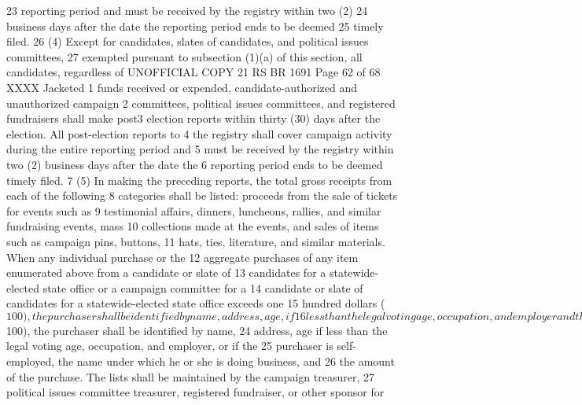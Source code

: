 23 reporting period and must be received by the registry within two (2)
24 business days after the date the reporting period ends to be deemed
25 timely filed.
26 (4) Except for candidates, slates of candidates, and political issues committees,
27 exempted pursuant to subsection (1)(a) of this section, all candidates, regardless of 
UNOFFICIAL COPY 21 RS BR 1691
Page 62 of 68
XXXX Jacketed
1 funds received or expended, candidate-authorized and unauthorized campaign
2 committees, political issues committees, and registered fundraisers shall make post3 election reports within thirty (30) days after the election. All post-election reports to
4 the registry shall cover campaign activity during the entire reporting period and
5 must be received by the registry within two (2) business days after the date the
6 reporting period ends to be deemed timely filed.
7 (5) In making the preceding reports, the total gross receipts from each of the following
8 categories shall be listed: proceeds from the sale of tickets for events such as
9 testimonial affairs, dinners, luncheons, rallies, and similar fundraising events, mass
10 collections made at the events, and sales of items such as campaign pins, buttons,
11 hats, ties, literature, and similar materials. When any individual purchase or the
12 aggregate purchases of any item enumerated above from a candidate or slate of
13 candidates for a statewide-elected state office or a campaign committee for a
14 candidate or slate of candidates for a statewide-elected state office exceeds one
15 hundred dollars ($100), the purchaser shall be identified by name, address, age, if
16 less than the legal voting age, occupation, and employer and the employer of the
17 spouse of the purchaser or, if the purchaser or the spouse of the purchaser is self18 employed, the name under which he or she is doing business, and the amount of the
19 purchase. When any individual purchase or the aggregate purchases of any item
20 enumerated above from any candidate or campaign committee other than a
21 candidate or slate of candidates for a statewide-elected state office or campaign
22 committee for a candidate or slate of candidates for a statewide-elected state office
23 exceeds one hundred dollars ($100), the purchaser shall be identified by name,
24 address, age if less than the legal voting age, occupation, and employer, or if the
25 purchaser is self-employed, the name under which he or she is doing business, and
26 the amount of the purchase. The lists shall be maintained by the campaign treasurer,
27 political issues committee treasurer, registered fundraiser, or other sponsor for 
